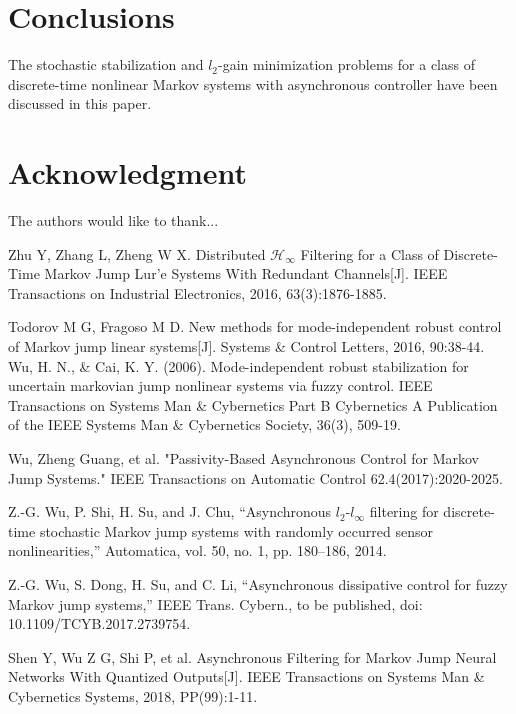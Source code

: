 \documentclass[conference]{IEEEtran}
\begin{document}
\section{Conclusions}
The stochastic stabilization and $l_{2}$-gain  minimization problems for a class of discrete-time nonlinear Markov systems with asynchronous controller have been discussed in this paper. 


\section*{Acknowledgment}


The authors would like to thank...


\begin{thebibliography}{1}
	Zhu Y, Zhang L, Zheng W X. Distributed ${\mathcal{H_{\infty}}}$ Filtering for a Class of Discrete-Time Markov Jump Lur’e Systems With Redundant Channels[J]. IEEE Transactions on Industrial Electronics, 2016, 63(3):1876-1885.
	
	Todorov M G, Fragoso M D. New methods for mode-independent robust control of Markov jump linear systems[J]. Systems \& Control Letters, 2016, 90:38-44.
	Wu, H. N., \& Cai, K. Y. (2006). Mode-independent robust stabilization for uncertain markovian jump nonlinear systems via fuzzy control. IEEE Transactions on Systems Man \& Cybernetics Part B Cybernetics A Publication of the IEEE Systems Man \& Cybernetics Society, 36(3), 509-19.
	
	Wu, Zheng Guang, et al. "Passivity-Based Asynchronous Control for Markov Jump Systems." IEEE Transactions on Automatic Control 62.4(2017):2020-2025.
	
	Z.-G. Wu, P. Shi, H. Su, and J. Chu, “Asynchronous $l_{2}$-$l_{\infty}$ filtering for discrete-time stochastic Markov jump systems with randomly occurred sensor nonlinearities,” Automatica, vol. 50, no. 1, pp. 180–186, 2014. 
	
	Z.-G. Wu, S. Dong, H. Su, and C. Li, “Asynchronous dissipative control for fuzzy Markov jump systems,” IEEE Trans. Cybern., to be published, doi: 10.1109/TCYB.2017.2739754.
	
	Shen Y, Wu Z G, Shi P, et al. Asynchronous Filtering for Markov Jump Neural Networks With Quantized Outputs[J]. IEEE Transactions on Systems Man \& Cybernetics Systems, 2018, PP(99):1-11.
	

\end{thebibliography}
\end{document}
